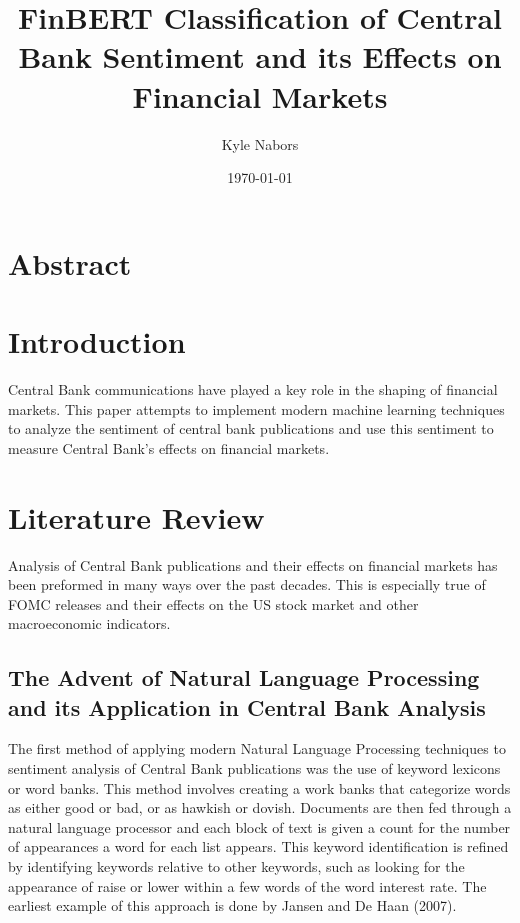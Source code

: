 \documentclass{article}
\begin{document}
\title{FinBERT Classification of Central Bank Sentiment and its Effects on Financial Markets}
\author{Kyle Nabors}
\date{\today}

\maketitle

\section{Abstract}


\section{Introduction}

Central Bank communications have played a key role in the shaping of financial markets. 
This paper attempts to implement modern machine learning techniques to analyze the sentiment of central bank publications and use this sentiment to measure Central Bank's effects on financial markets. 

\section{Literature Review}
Analysis of Central Bank publications and their effects on financial markets has been preformed in many ways over the past decades. This is especially true of FOMC releases and their effects on the US stock market and other macroeconomic indicators. 

\subsection{The Advent of Natural Language Processing and its Application in Central Bank Analysis}
The first method of applying modern Natural Language Processing techniques to sentiment analysis of Central Bank publications was the use of keyword lexicons or word banks. 
This method involves creating a work banks that categorize words as either good or bad, or as hawkish or dovish. 
Documents are then fed through a natural language processor and each block of text is given a count for the number of appearances a word for each list appears. 
This keyword identification is refined by identifying keywords relative to other keywords, such as looking for the appearance of raise or lower within a few words of the word interest rate. 
The earliest example of this approach is done by Jansen and De Haan (2007). 
\end{document}
